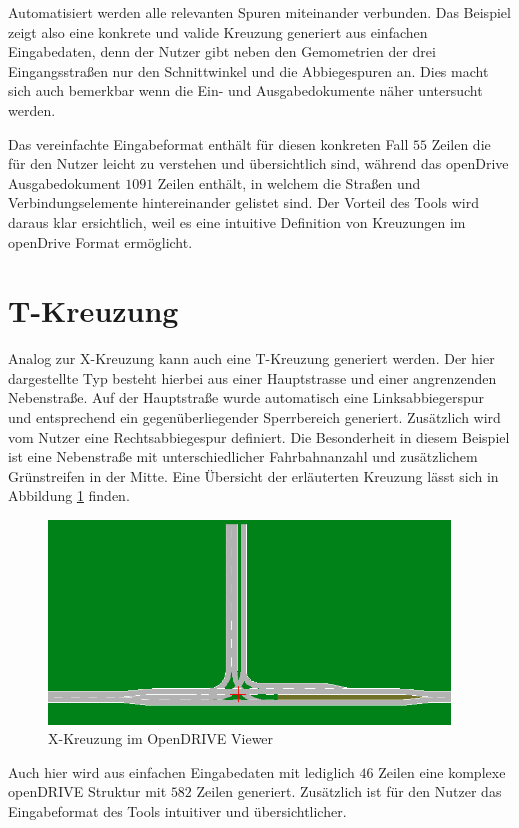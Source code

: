 Automatisiert werden alle relevanten Spuren miteinander verbunden. Das Beispiel zeigt also eine konkrete und valide Kreuzung generiert aus einfachen Eingabedaten, denn der Nutzer gibt neben den Gemometrien der drei Eingangsstraßen nur den Schnittwinkel und die Abbiegespuren an. Dies macht sich auch bemerkbar wenn die Ein- und Ausgabedokumente näher untersucht werden. 

Das vereinfachte Eingabeformat enthält für diesen konkreten Fall \(55\) Zeilen die für den Nutzer leicht zu verstehen und übersichtlich sind, während das openDrive Ausgabedokument \(1091\) Zeilen enthält, in welchem die Straßen und Verbindungselemente hintereinander gelistet sind. Der Vorteil des Tools wird daraus klar ersichtlich, weil es eine intuitive Definition von Kreuzungen im openDrive Format ermöglicht. 

\section{T-Kreuzung}
Analog zur X-Kreuzung kann auch eine T-Kreuzung generiert werden. Der hier dargestellte Typ besteht hierbei aus einer Hauptstrasse und einer angrenzenden Nebenstraße. Auf der Hauptstraße wurde automatisch eine Linksabbiegerspur und entsprechend ein gegenüberliegender Sperrbereich generiert. Zusätzlich wird vom Nutzer eine Rechtsabbiegespur definiert. Die Besonderheit in diesem Beispiel ist eine Nebenstraße mit unterschiedlicher Fahrbahnanzahl und zusätzlichem Grünstreifen in der Mitte. Eine Übersicht der erläuterten Kreuzung lässt sich in Abbildung \ref{abb7} finden.

\begin{figure}[H]
    \flushleft
    \includegraphics[width=0.95\textwidth]{fig/junction3.png}
    \caption{X-Kreuzung im OpenDRIVE Viewer}
    \label{abb7}
\end{figure}

Auch hier wird aus einfachen Eingabedaten mit lediglich \(46\) Zeilen eine komplexe openDRIVE Struktur mit \(582\) Zeilen generiert. Zusätzlich ist für den Nutzer das Eingabeformat des Tools intuitiver und übersichtlicher.

